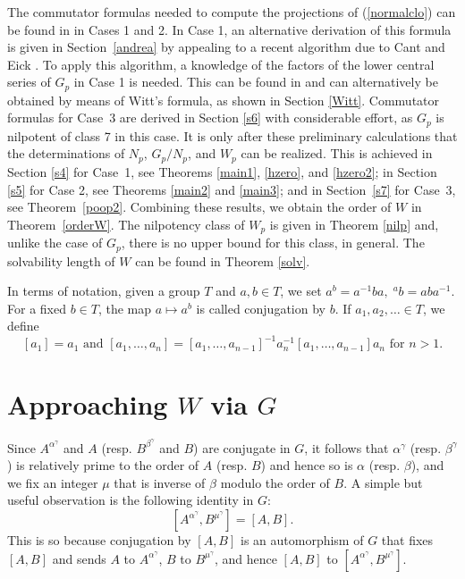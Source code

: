 \documentclass{amsart}
\theoremstyle{definition}
\theoremstyle{remark}
\begin{document}
The commutator formulas needed to compute the projections of (\ref{normalclo}) can be found in \cite{MS2} in Cases 1 and 2.
In Case 1, an alternative derivation of this formula is given in Section~\ref{andrea}
by appealing to a recent algorithm due to Cant and Eick \cite{CE}. To apply this
algorithm, a knowledge of the factors of the lower central series of $G_p$ in Case 1 is needed.
This can be found in \cite[Theorem 8.1]{MS} and can alternatively be obtained by means of Witt's formula,
as shown in Section \ref{Witt}. Commutator formulas for Case~3 are derived in 
Section \ref{s6} with considerable effort, as $G_p$ is nilpotent of class 7 in this case.
It is only after these preliminary calculations that the determinations of $N_p$, $G_p/N_p$, and $W_p$ can be realized. This
is achieved in Section \ref{s4} for Case~1, see Theorems \ref{main1}, \ref{hzero}, and \ref{hzero2}; 
in Section \ref{s5} for Case 2, see Theorems \ref{main2} and \ref{main3}; and in Section~\ref{s7} for Case~3,
see Theorem~\ref{poop2}. Combining these results, we obtain the order of $W$ in Theorem~\ref{orderW}.
The nilpotency class of $W_p$ is given in Theorem \ref{nilp} and,
unlike the case of $G_p$, there is no upper bound for this class, in general. The solvability length of $W$ can
be found in Theorem \ref{solv}. %



In terms of notation, given a group  $T$ and $a,b\in T$, we set
$
a^b=a^{-1}ba,\; {}^a b=aba^{-1}.
$
For a fixed $b\in T$, the map $a\mapsto a^b$ is called conjugation by $b$. If $a_1,a_2,\dots\in T$, we define
$$
[a_1]=a_1\text{ and }[a_1,\dots,a_n]=[a_1,\dots,a_{n-1}]^{-1}a_n^{-1}[a_1,\dots,a_{n-1}]a_n\text{ for }n>1.
$$


\section{Approaching $W$ via $G$}\label{s2}


Since $A^{\alpha^\gamma}$ and $A$ (resp. $B^{\beta^\gamma}$ and $B$) 
are conjugate in $G$, it follows that $\alpha^\gamma$ (resp. $\beta^\gamma$)
is relatively prime to the order of $A$ (resp. $B$) and hence so is $\alpha$ (resp. $\beta$), and we fix
an integer $\mu$ that is inverse of $\beta$ modulo the order of $B$. A simple but useful observation is
the following identity in $G$:
$$
[A^{\alpha^\gamma},B^{\mu^\gamma}]=[A,B].
$$
This is so because conjugation by $[A,B]$ is an automorphism of $G$ that fixes $[A,B]$
and sends $A$ to $A^{\alpha^\gamma}$, $B$ to $B^{\mu^\gamma}$, and hence $[A,B]$ to $[A^{\alpha^\gamma},B^{\mu^\gamma}]$.
\end{document}
